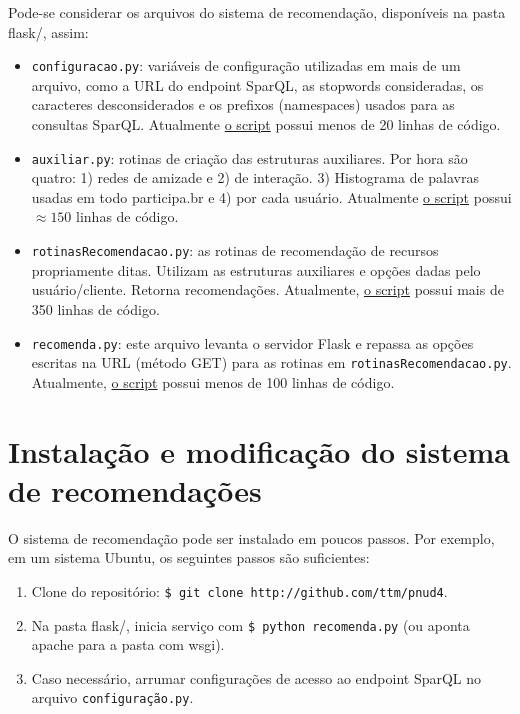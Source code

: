 \documentclass[12pt]{article}
\begin{document}
Pode-se considerar os arquivos do sistema de recomendação, disponíveis na pasta flask/, assim:
\begin{itemize}
    \item \texttt{configuracao.py}: variáveis de configuração utilizadas em mais de um arquivo, como a URL do endpoint SparQL, as stopwords consideradas, os caracteres desconsiderados e os prefixos (namespaces) usados para as consultas SparQL. Atualmente \href{https://github.com/ttm/pnud4/blob/master/flask/configuracao.py}{o script} possui menos de 20 linhas de código.
    \item \texttt{auxiliar.py}: rotinas de criação das estruturas auxiliares. Por hora são quatro: 1) redes de amizade e 2) de interação. 3) Histograma de palavras usadas em todo participa.br e 4) por cada usuário. Atualmente \href{https://github.com/ttm/pnud4/blob/master/flask/auxiliar.py}{o script} possui $\approx 150$ linhas de código.
    \item \texttt{rotinasRecomendacao.py}: as rotinas de recomendação de recursos propriamente ditas. Utilizam as estruturas auxiliares e opções dadas pelo usuário/cliente. Retorna recomendações. Atualmente, \href{https://github.com/ttm/pnud4/blob/master/flask/rotinasRecomendacao.py}{o script} possui mais de 350 linhas de código.
    \item \texttt{recomenda.py}: este arquivo levanta o servidor Flask e repassa as opções escritas na URL (método GET) para as rotinas em \texttt{rotinasRecomendacao.py}. Atualmente, \href{https://github.com/ttm/pnud4/blob/master/flask/recomenda.py}{o script} possui menos de 100 linhas de código.
\end{itemize}

\section{Instalação e modificação do sistema de recomendações}\label{sec:inst}
O sistema de recomendação pode ser instalado em poucos passos. Por exemplo, em um sistema Ubuntu, os seguintes passos são suficientes:
\begin{enumerate}
    \item Clone do repositório: \texttt{\$ git clone http://github.com/ttm/pnud4}.
    \item Na pasta flask/, inicia serviço com \texttt{\$ python recomenda.py} (ou aponta apache para a pasta com wsgi).
    \item Caso necessário, arrumar configurações de acesso ao endpoint SparQL no arquivo \texttt{configuração.py}.
\end{enumerate}
\end{document}
